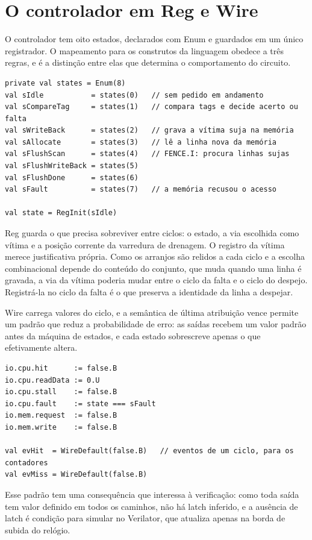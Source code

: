 \section{O controlador em Reg e Wire}\label{sec:5.5}

O controlador tem oito estados, declarados com Enum e guardados em um único registrador. O mapeamento para os construtos da linguagem obedece a três regras, e é a distinção entre elas que determina o comportamento do circuito.


{\footnotesize
\begin{verbatim}
private val states = Enum(8)
val sIdle           = states(0)   // sem pedido em andamento
val sCompareTag     = states(1)   // compara tags e decide acerto ou falta
val sWriteBack      = states(2)   // grava a vítima suja na memória
val sAllocate       = states(3)   // lê a linha nova da memória
val sFlushScan      = states(4)   // FENCE.I: procura linhas sujas
val sFlushWriteBack = states(5)
val sFlushDone      = states(6)
val sFault          = states(7)   // a memória recusou o acesso

val state = RegInit(sIdle)
\end{verbatim}
}


Reg guarda o que precisa sobreviver entre ciclos: o estado, a via escolhida como vítima e a posição corrente da varredura de drenagem. O registro da vítima merece justificativa própria. Como os arranjos são relidos a cada ciclo e a escolha combinacional depende do conteúdo do conjunto, que muda quando uma linha é gravada, a via da vítima poderia mudar entre o ciclo da falta e o ciclo do despejo. Registrá-la no ciclo da falta é o que preserva a identidade da linha a despejar.

Wire carrega valores do ciclo, e a semântica de última atribuição vence permite um padrão que reduz a probabilidade de erro: as saídas recebem um valor padrão antes da máquina de estados, e cada estado sobrescreve apenas o que efetivamente altera.


{\footnotesize
\begin{verbatim}
io.cpu.hit      := false.B
io.cpu.readData := 0.U
io.cpu.stall    := false.B
io.cpu.fault    := state === sFault
io.mem.request  := false.B
io.mem.write    := false.B

val evHit  = WireDefault(false.B)   // eventos de um ciclo, para os contadores
val evMiss = WireDefault(false.B)
\end{verbatim}
}


Esse padrão tem uma consequência que interessa à verificação: como toda saída tem valor definido em todos os caminhos, não há latch inferido, e a ausência de latch é condição para simular no Verilator, que atualiza apenas na borda de subida do relógio.

